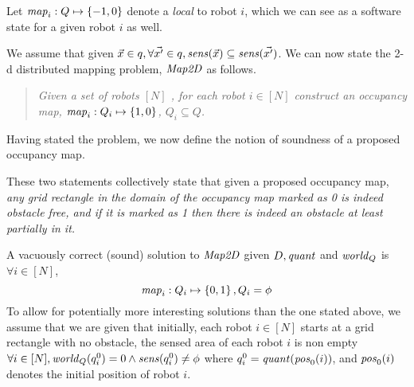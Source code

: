 Let $\mathit{map}_i:Q\mapsto \left\{-1,0\right\}$ denote a \qdfunc \emph{local} to robot $i$, which we can see as a software state for a given robot $i$ as well.  %



We assume that given $\Vec{x} \in q, \forall \Vec{x^\prime} \in q, \mathit{sens}(\Vec{x}) \subseteq \mathit{sens}(\Vec{x^\prime})$. We can now state the 2-d distributed mapping problem, $\mathit{Map2D}$ as follows. \begin{quote}
{\em Given a set of robots $[N]$ , for each robot $i \in [N]$ construct an \emph{occupancy map}, $\mathit{map}_i: Q_i \mapsto \left\{1,0\right\}$, $Q_i\subseteq Q$.
}
\end{quote}


Having stated the problem, we now define the notion of soundness of a proposed occupancy map.
\begin{definition}
    \label{soundness}
   
\end{definition}


These two statements collectively state that given a proposed occupancy map, \emph{any grid rectangle in the domain of the occupancy map marked as 0 is indeed obstacle free, and if it is marked as 1 then there is indeed an obstacle at least partially in it.}



A vacuously correct (sound) solution to $\mathit{Map2D}$ given $D, \mathit{quant}$ and $\mathit{world}_Q$ is $\forall i \in [N]$, $$\mathit{map}_i : Q_i \mapsto \left\{0,1\right\}, Q_i = \phi$$ To allow for potentially more interesting solutions than the one stated above, we assume that we are given that initially, each robot $i\in[N]$ starts at a grid rectangle with no obstacle, the sensed area of each robot $i$ is non empty
$\forall i \in [N], \mathit{world}_Q(q^0_i) = 0\wedge \mathit{sens}(q^0_i) \neq \phi$
where $q^0_i = \mathit{quant}(\mathit{pos}_0(i))$, and $\mathit{pos}_0(i)$ denotes the initial position of robot $i$.

